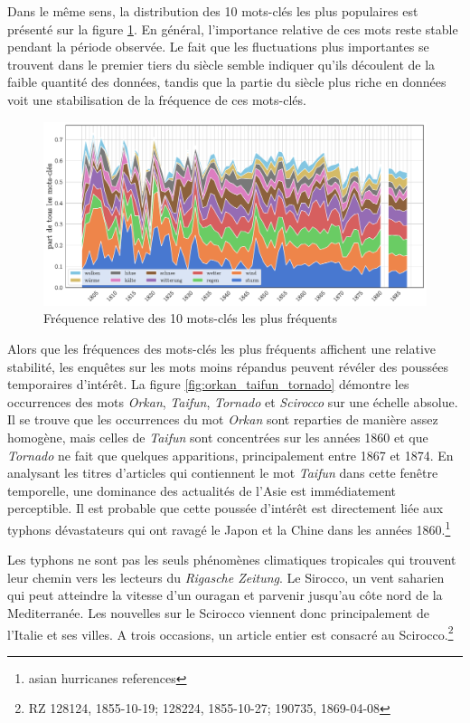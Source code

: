 \documentclass[a4paper,twoside,12pt]{article}
\begin{document}
Dans le même sens, la distribution des 10 mots-clés les plus populaires est présenté sur la figure \ref{fig:top_keywords10}. En général, l'importance relative de ces mots reste stable pendant la période observée. Le fait que les fluctuations plus importantes se trouvent dans le premier tiers du siècle semble indiquer qu'ils découlent de la faible quantité des données, tandis que la partie du siècle plus riche en données voit une stabilisation de la fréquence de ces mots-clés.

\begin{figure}[h]
    \centering
    \includegraphics[width=\textwidth]{images/10_most_frequent_ents.pdf}
    \caption{Fréquence relative des 10 mots-clés les plus fréquents}
    \label{fig:top_keywords10}
\end{figure}

Alors que les fréquences des mots-clés les plus fréquents affichent une relative stabilité, les enquêtes sur les mots moins répandus peuvent révéler des poussées temporaires d'intérêt. La figure \ref{fig:orkan_taifun_tornado} démontre les occurrences des mots \textit{Orkan}, \textit{Taifun}, \textit{Tornado} et \textit{Scirocco} sur une échelle absolue. Il se trouve que les occurrences du mot \textit{Orkan} sont reparties de manière assez homogène, mais celles de \textit{Taifun} sont concentrées sur les années 1860 et que \textit{Tornado} ne fait que quelques apparitions, principalement entre 1867 et 1874. En analysant les titres d'articles qui contiennent le mot \textit{Taifun} dans cette fenêtre temporelle, une dominance des actualités de l'Asie est immédiatement perceptible. Il est probable que cette poussée d'intérêt est directement liée aux typhons dévastateurs qui ont ravagé le Japon et la Chine dans les années 1860.\footnote{asian hurricanes references}

Les typhons ne sont pas les seuls phénomènes climatiques tropicales qui trouvent leur chemin vers les lecteurs du \textit{Rigasche Zeitung}. Le Sirocco, un vent saharien qui peut atteindre la vitesse d'un ouragan et parvenir jusqu'au côte nord de la Mediterranée. Les nouvelles sur le Scirocco viennent donc principalement de l'Italie et ses villes. A trois occasions, un article entier est consacré au Scirocco.\footnote{RZ 128124, 1855-10-19; 128224, 1855-10-27; 190735, 1869-04-08}
\end{document}
